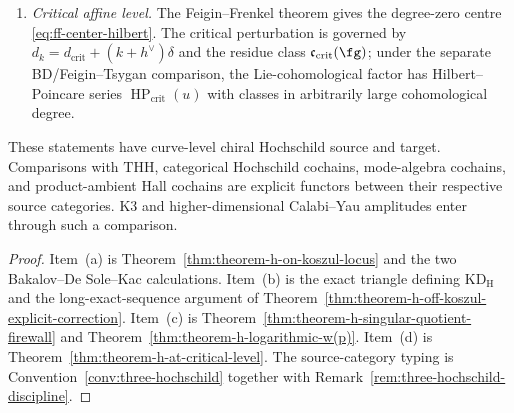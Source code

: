 \begin{theorem}
\begin{enumerate}[label=\textup{(\alph*)}]
Remark~\ref{rem:class-m-raw-comparison-open}; the completed comparison
uses its stated CP1--CP3 package.
\item \emph{Critical affine level.}
The Feigin--Frenkel theorem gives the degree-zero centre
\eqref{eq:ff-center-hilbert}. The critical perturbation is governed
by $d_k=d_{\mathrm{crit}}+(k+h^\vee)\delta$ and the residue class
$\mathfrak c_{\mathrm{crit}}(\fg)$; under the separate
BD/Feigin--Tsygan comparison, the Lie-cohomological factor has
Hilbert--Poincare series $\operatorname{HP}_{\mathrm{crit}}(u)$ with
classes in arbitrarily large cohomological degree.
\end{enumerate}
These statements have curve-level chiral Hochschild source and target.
Comparisons with $\mathrm{THH}$, categorical Hochschild cochains,
mode-algebra cochains, and product-ambient Hall cochains are explicit
functors between their respective source categories.  K3 and
higher-dimensional Calabi--Yau amplitudes enter through such a
comparison.
\end{theorem}

\begin{proof}
Item~(a) is Theorem~\ref{thm:theorem-h-on-koszul-locus} and the two
Bakalov--De Sole--Kac calculations. Item~(b) is the exact triangle
defining $\mathrm{KD}_{\mathrm H}$ and the long-exact-sequence argument of
Theorem~\ref{thm:theorem-h-off-koszul-explicit-correction}. Item~(c)
is Theorem~\ref{thm:theorem-h-singular-quotient-firewall} and
Theorem~\ref{thm:theorem-h-logarithmic-w(p)}. Item~(d) is
Theorem~\ref{thm:theorem-h-at-critical-level}. The source-category
typing is Convention~\ref{conv:three-hochschild} together with
Remark~\ref{rem:three-hochschild-discipline}.
\end{proof}
